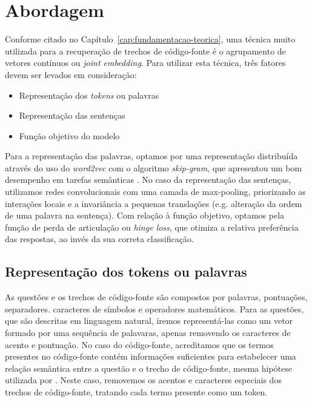 \chapter{Abordagem}
\label{cap:abordagem}

Conforme citado no Capítulo~\ref{cap:fundamentacao-teorica}, uma técnica muito utilizada para a recuperação de trechos de código-fonte é o agrupamento de vetores contínuos ou \textit{joint embedding}. Para utilizar esta técnica, três fatores devem ser levados em consideração:

\begin{itemize}
    \item Representação dos \textit{tokens} ou palavras
    \item Representação das sentenças
    \item Função objetivo do modelo
\end{itemize}

Para a representação das palavras, optamos por uma representação distribuída através do uso do \textit{word2vec} com o algoritmo \textit{skip-gram}, que apresentou um bom desempenho em tarefas semânticas \citep{mikolov2013distributed}. No caso da representação das sentenças, utilizamos redes convolucionais com uma camada de \gls{max-pooling}, priorizando as interações locais e a invariância a pequenas translações (e.g. alteração da ordem de uma palavra na sentença). Com relação à função objetivo, optamos pela função de perda de articulação ou \textit{hinge loss}, que otimiza a relativa preferência das respostas, ao invés da sua correta classificação.



\section{Representação dos tokens ou palavras}
\label{sec:abordagem-representacao-token}

As questões e os trechos de código-fonte são compostos por palavras, pontuações, separadores. caracteres de símbolos e operadores matemáticos. Para as questões, que são descritas em linguagem natural, iremos representá-las como um vetor formado por uma sequência de palavaras, apenas removendo os caracteres de acento e pontuação. No caso do código-fonte, acreditamos que os termos presentes no código-fonte contém informações suficientes para estabelecer uma relação semântica entre a questão e o trecho de código-fonte, mesma hipótese utilizada por \cite{Sachdev-neural-code-search:2018}. Neste caso, removemos os acentos e caracteres especiais dos trechos de código-fonte, tratando cada termo presente como um \gls{token}.

